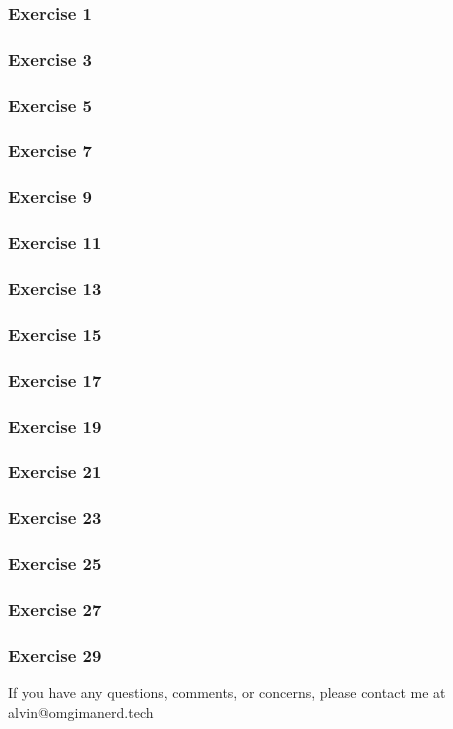 \documentclass{math}
\begin{document}
\subsubsection*{Exercise 1}
\subsubsection*{Exercise 3}
\subsubsection*{Exercise 5}
\subsubsection*{Exercise 7}
\subsubsection*{Exercise 9}
\subsubsection*{Exercise 11}
\subsubsection*{Exercise 13}
\subsubsection*{Exercise 15}
\subsubsection*{Exercise 17}
\subsubsection*{Exercise 19}
\subsubsection*{Exercise 21}
\subsubsection*{Exercise 23}
\subsubsection*{Exercise 25}
\subsubsection*{Exercise 27}
\subsubsection*{Exercise 29}

\begin{center}
  If you have any questions, comments, or concerns, please contact me at
  alvin@omgimanerd.tech
\end{center}
\end{document}
